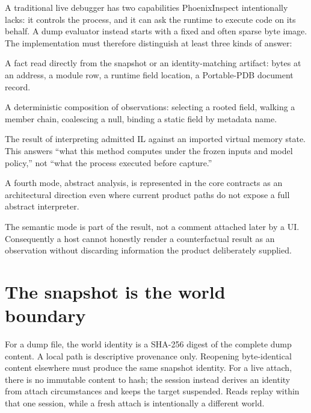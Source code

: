 \documentclass[11pt,oneside,openany]{book}
\begin{document}
A traditional live debugger has two capabilities PhoenixInspect intentionally lacks: it controls the process, and it can ask the runtime to execute code on its behalf. A dump evaluator instead starts with a fixed and often sparse byte image. The implementation must therefore distinguish at least three kinds of answer:

\begin{description}[style=nextline]
  \item[Observation] A fact read directly from the snapshot or an identity-matching artifact: bytes at an address, a module row, a runtime field location, a Portable-PDB document record.
  \item[Derived query] A deterministic composition of observations: selecting a rooted field, walking a member chain, coalescing a null, binding a static field by metadata name.
  \item[Counterfactual execution] The result of interpreting admitted IL against an imported virtual memory state. This answers ``what this method computes under the frozen inputs and model policy,'' not ``what the process executed before capture.''
\end{description}

A fourth mode, abstract analysis, is represented in the core contracts as an architectural direction even where current product paths do not expose a full abstract interpreter.

\begin{invariantbox}
The semantic mode is part of the result, not a comment attached later by a UI. Consequently a host cannot honestly render a counterfactual result as an observation without discarding information the product deliberately supplied.
\end{invariantbox}

\section{The snapshot is the world boundary}

For a dump file, the world identity is a SHA-256 digest of the complete dump content. A local path is descriptive provenance only. Reopening byte-identical content elsewhere must produce the same snapshot identity. For a live attach, there is no immutable content to hash; the session instead derives an identity from attach circumstances and keeps the target suspended. Reads replay within that one session, while a fresh attach is intentionally a different world.
\end{document}
